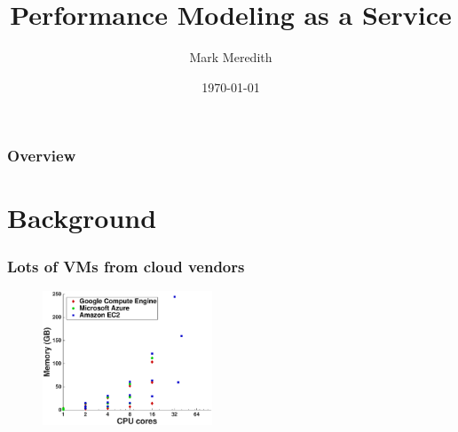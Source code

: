 \documentclass{beamer}
\title[PMAAS]{Performance Modeling as a Service} %
\author{Mark Meredith} %
\institute[Penn State] %
{
Pennsylvania State University \\ %
\medskip
\textit{mwm126@cse.psu.edu} %
}
\date{\today} %
\begin{document}
\begin{frame}
\titlepage %
\end{frame}

\begin{frame}
\frametitle{Overview} %
\tableofcontents %
\end{frame}




\section{Background}
\begin{frame}
\frametitle{Lots of VMs from cloud vendors}
\begin{figure}[htbp]
\centering
\includegraphics[width=0.45\textwidth]{cloud_vm_types.eps}
\end{figure}
\end{frame}
\end{document}
